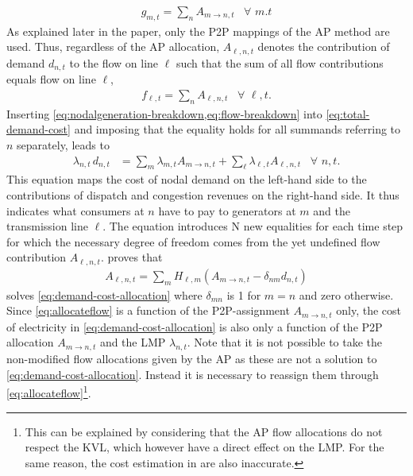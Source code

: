 \documentclass[11pt,twocolumn]{article}
\newcommand{\Forall}[1]{\hspace{10pt} \forall \,\, #1 }
\newcommand{\nodalgeneration}[1][n]{g_{#1,t}}
\newcommand{\flow}{f_{\ell,t}}
\newcommand{\lmp}[1][n]{\lambda_{#1,t}}
\newcommand{\demand}[1][n]{d_{#1,t}}
\newcommand{\ptdf}[1][n]{H_{\ell,#1}}
\newcommand{\allocatepeer}[1][m \rightarrow n]{A_{#1,t}}
\newcommand{\allocateflow}[1][n]{A_{\ell,#1,t}}
\begin{document}
\begin{align}
    \nodalgeneration[m] = \sum_n \allocatepeer \Forall{m.t}
    \label{eq:nodalgeneration-breakdown}
\end{align}
As explained later in the paper, only the \ac{P2P} mappings of the \ac{AP} method are used. Thus, regardless of the \ac{AP} allocation, $\allocateflow$ denotes the contribution of demand $\demand$ to the flow on line $\ell$ such that the sum of all flow contributions equals flow on line $\ell$,
\begin{align}
    \flow = \sum_n \allocateflow \Forall{\ell,t}.
    \label{eq:flow-breakdown}
\end{align}
Inserting \cref{eq:nodalgeneration-breakdown,eq:flow-breakdown} into \cref{eq:total-demand-cost} and imposing that the equality holds for all summands referring to $n$ separately, leads to
\begin{align}
    \lmp\, \demand & = \sum_m \lmp[m] \allocatepeer + \sum_\ell \lmp[\ell] \allocateflow \Forall{n,t}.
    \label{eq:demand-cost-allocation}
\end{align}
This equation maps the cost of nodal demand on the left-hand side to the contributions of dispatch and congestion revenues on the right-hand side. It thus indicates what consumers at $n$ have to pay to generators at $m$ and the transmission line $\ell$. The equation introduces N new equalities for each time step for which the necessary degree of freedom comes from the yet undefined flow contribution $\allocateflow$.  proves that
\begin{align}
    \allocateflow = \sum_m \ptdf[m] (\allocatepeer - \delta_{nm} \demand)
    \label{eq:allocateflow}
\end{align}
solves \cref{eq:demand-cost-allocation} where $\delta_{mn}$ is 1 for $m=n$ and zero otherwise. Since \cref{eq:allocateflow} is a function of the \ac{P2P}-assignment $\allocatepeer$ only, the cost of electricity in \cref{eq:demand-cost-allocation} is also only a function of the \ac{P2P} allocation $\allocatepeer$ and the \ac{LMP} $\lmp$.
Note that it is not possible to take the non-modified flow allocations given by the \ac{AP} as these are not a solution to \cref{eq:demand-cost-allocation}. Instead it is necessary to reassign them through \cref{eq:allocateflow}\footnote{This can be explained by considering that the \ac{AP} flow allocations do not respect the \ac{KVL}, which however have a direct effect on the \ac{LMP}. For the same reason, the cost estimation in \cite{meng_investigation_2007} are also inaccurate.}.
\end{document}
